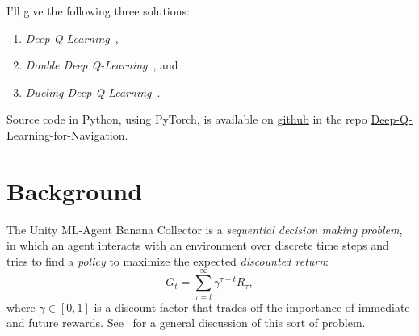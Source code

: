 \documentclass[tog]{acmsiggraph}
\begin{document}
I'll give the following three solutions:
\begin{enumerate}
	\item {\em Deep Q-Learning}~\cite{DBLP:journals/nature/MnihKSRVBGRFOPB15},
	\item {\em Double Deep Q-Learning}~\cite{DBLP:journals/corr/HasseltGS15}, and
	\item {\em Dueling Deep Q-Learning}~\cite{DBLP:journals/corr/WangFL15}. 
\end{enumerate}
Source code in Python, using PyTorch, is available on 
\href{http://github.com}{\underline{github}} 
in the repo 
\href{http://github.com/bobflagg/Deep-Q-Learning-for-Navigation}{\underline{Deep-Q-Learning-for-Navigation}}.
\section{Background}

The Unity ML-Agent Banana Collector is a {\em sequential decision making problem}, in which an agent interacts with an environment over discrete time
steps and tries to find a {\em policy} to maximize the expected {\em discounted return}:
$$G_t = \sum_{\tau=t}^{\infty}\gamma^{\tau-t}R_\tau,$$
where $\gamma\in[0,1]$  is a discount factor that trades-off the importance of immediate and future rewards.
See~\cite{DBLP:books/lib/SuttonB98} for a general discussion of this sort of problem. 
\end{document}
